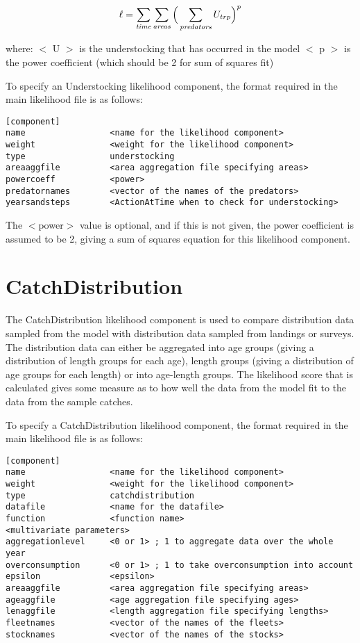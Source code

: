 \documentclass[10pt,twoside]{book}
\begin{document}
\begin{equation}\label{eq:understocking}
\ell = \sum_{\it time}\sum_{\it areas} \Big(\sum_{\it predators} U_{trp} \Big)^p
\end{equation}

where:\newline
$<$ U $>$ is the understocking that has occurred in the model\newline
$<$ p $>$ is the power coefficient (which should be 2 for sum of squares fit)

\bigskip
To specify an Understocking likelihood component, the format required in the main likelihood file is as follows:

{\small\begin{verbatim}
[component]
name                 <name for the likelihood component>
weight               <weight for the likelihood component>
type                 understocking
areaaggfile          <area aggregation file specifying areas>
powercoeff           <power>
predatornames        <vector of the names of the predators>
yearsandsteps        <ActionAtTime when to check for understocking>
\end{verbatim}}

The $<$power$>$ value is optional, and if this is not given, the power coefficient is assumed to be 2, giving a sum of squares equation for this likelihood component.

\section{CatchDistribution}\label{sec:catchdist}
The CatchDistribution likelihood component is used to compare distribution data sampled from the model with distribution data sampled from landings or surveys.  The distribution data can either be aggregated into age groups (giving a distribution of length groups for each age), length groups (giving a distribution of age groups for each length) or into age-length groups.  The likelihood score that is calculated gives some measure as to how well the data from the model fit to the data from the sample catches.

\bigskip
To specify a CatchDistribution likelihood component, the format required in the main likelihood file is as follows:

{\small\begin{verbatim}
[component]
name                 <name for the likelihood component>
weight               <weight for the likelihood component>
type                 catchdistribution
datafile             <name for the datafile>
function             <function name>
<multivariate parameters>
aggregationlevel     <0 or 1> ; 1 to aggregate data over the whole year
overconsumption      <0 or 1> ; 1 to take overconsumption into account
epsilon              <epsilon>
areaaggfile          <area aggregation file specifying areas>
ageaggfile           <age aggregation file specifying ages>
lenaggfile           <length aggregation file specifying lengths>
fleetnames           <vector of the names of the fleets>
stocknames           <vector of the names of the stocks>
\end{verbatim}}
\end{document}
